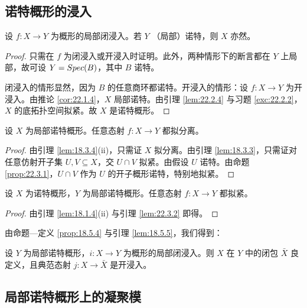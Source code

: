 \subsection{诺特概形的浸入}\label{sec:22.3}

\begin{proposition}\label{prop:22.3.1}
设 $f\colon X \to Y$ 为概形的局部闭浸入。若 $Y$ （局部）诺特，则 $X$ 亦然。
\end{proposition}

\begin{proof}
只需在 $f$ 为闭浸入或开浸入时证明。此外，两种情形下的断言都在 $Y$ 上局部，故可设 $Y = Spec(B)$，其中 $B$ 诺特。

闭浸入的情形显然，因为 $B$ 的任意商环都诺特。开浸入的情形：设 $f\colon X \to Y$ 为开浸入。由推论 \ref{cor:22.1.4}，$X$ 局部诺特。由引理 \ref{lem:22.2.4} 与习题 \ref{exc:22.2.2}，$X$ 的底拓扑空间拟紧。故 $X$ 是诺特概形。
\end{proof}

\begin{lemma}\label{lem:22.3.2}
设 $X$ 为局部诺特概形。任意态射 $f\colon X \to Y$ 都拟分离。
\end{lemma}

\begin{proof}
由引理 \ref{lem:18.3.4}(ii)，只需证 $X$ 拟分离。由引理 \ref{lem:18.3.3}，只需证对任意仿射开子集 $U, V \subseteq X$，交 $U \cap V$ 拟紧。由假设 $U$ 诺特。由命题 \ref{prop:22.3.1}，$U \cap V$ 作为 $U$ 的开子概形诺特，特别地拟紧。
\end{proof}

\begin{lemma}\label{lem:22.3.3}
设 $X$ 为诺特概形，$Y$ 为局部诺特概形。任意态射 $f\colon X \to Y$ 都拟紧。
\end{lemma}

\begin{proof}
由引理 \ref{lem:18.1.4}(ii) 与引理 \ref{lem:22.3.2} 即得。
\end{proof}

由命题—定义 \ref{prop:18.5.4} 与引理 \ref{lem:18.5.5}，我们得到：

\begin{corollary}\label{cor:22.3.4}
设 $Y$ 为局部诺特概形，$i\colon X \to Y$ 为概形的局部闭浸入。则 $X$ 在 $Y$ 中的闭包 $\bar X$ 良定义，且典范态射 $j\colon X \to \bar X$ 是开浸入。
\end{corollary}

\subsection{局部诺特概形上的凝聚模}\label{sec:22.4}

